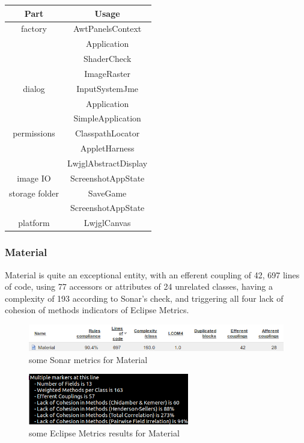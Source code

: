 \documentclass[a4paper, 10pt]{article}
\begin{document}
\begin{tabular}{|c|c|}
\hline
\textbf{Part}&\textbf{Usage}\\\hline
factory	& AwtPanelsContext\\\hline
		& Application\\\hline
		& ShaderCheck\\\hline
		& ImageRaster\\\hline
dialog	& InputSystemJme\\\hline
		& Application\\\hline
		& SimpleApplication\\\hline
permissions	& ClasspathLocator\\\hline
		& AppletHarness\\\hline
		& LwjglAbstractDisplay\\\hline
image IO	& ScreenshotAppState\\\hline
storage folder	& SaveGame\\\hline
		& ScreenshotAppState\\\hline
platform	& LwjglCanvas\\\hline
\end{tabular}

\subsubsection{Material}
Material is quite an exceptional entity,
with an efferent coupling of 42,
697 lines of code,
using 77 accessors or attributes of 24 unrelated classes,
having a complexity of 193 according to Sonar's check, and
triggering all four lack of cohesion of methods indicators of Eclipse Metrics.

\begin{figure}[htb!]
\centering
\includegraphics[width=\textwidth]{figures/material-sonar.png}
\vspace{-20pt}
\caption{some Sonar metrics for Material}
\label{fig:material-sonar}
\end{figure}
\vspace{-20pt}
\begin{figure}[htb!]
\centering
\includegraphics[width=70mm]{figures/material-metrics.png}
\vspace{-10pt}
\caption{some Eclipse Metrics results for Material}
\label{fig:material-metrics}
\end{figure}
\end{document}
